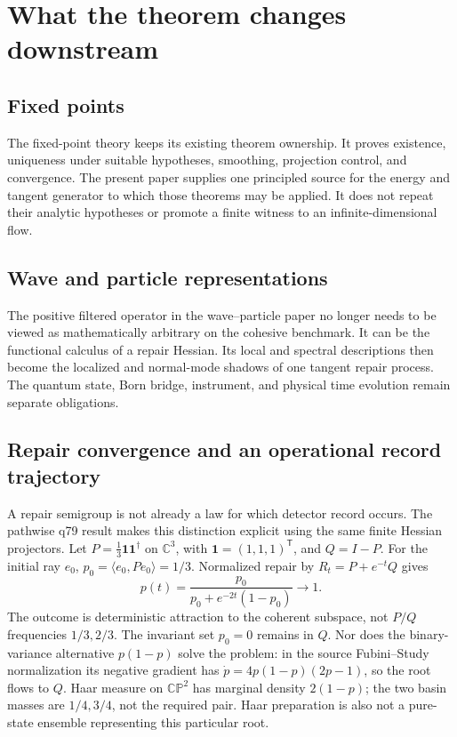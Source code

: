 \documentclass[11pt,a4paper]{article}
\begin{document}
\section{What the theorem changes downstream}

\subsection{Fixed points}

The fixed-point theory keeps its existing theorem ownership.  It proves
existence, uniqueness under suitable hypotheses, smoothing, projection
control, and convergence.  The present paper supplies one principled source
for the energy and tangent generator to which those theorems may be applied.
It does not repeat their analytic hypotheses or promote a finite witness to
an infinite-dimensional flow.

\subsection{Wave and particle representations}

The positive filtered operator in the wave--particle paper no longer needs
to be viewed as mathematically arbitrary on the cohesive benchmark.  It can
be the functional calculus of a repair Hessian.  Its local and spectral
descriptions then become the localized and normal-mode shadows of one tangent
repair process.  The quantum state, Born bridge, instrument, and physical
time evolution remain separate obligations.

\subsection{Repair convergence and an operational record trajectory}
\label{sec:q79-pathwise-repair}

A repair semigroup is not already a law for which detector record occurs.
The pathwise q79 result \cite{Q79PathwiseRepair2026} makes this distinction
explicit using the same finite Hessian projectors. Let
\(P=\frac13\mathbf1\mathbf1^\dagger\) on \(\mathbb C^3\), with
\(\mathbf1=(1,1,1)^{\mathsf T}\), and \(Q=I-P\).
For the initial ray \(e_0\), \(p_0=\langle e_0,Pe_0\rangle=1/3\).
Normalized repair by \(R_t=P+e^{-t}Q\) gives
\begin{equation}
 p(t)=\frac{p_0}{p_0+e^{-2t}(1-p_0)}\longrightarrow1 .
 \tag{Q5}\label{eq:q79-repair-weight}
\end{equation}
The outcome is deterministic attraction to the coherent subspace, not
\(P/Q\) frequencies \(1/3,2/3\). The invariant set \(p_0=0\) remains in
\(Q\). Nor does the binary-variance alternative \(p(1-p)\) solve the problem:
in the source Fubini--Study normalization its negative gradient has
\(\dot p=4p(1-p)(2p-1)\), so the root flows to \(Q\). Haar measure on
\(\mathbb{CP}^2\) has marginal density \(2(1-p)\); the two basin masses
are \(1/4,3/4\), not the required pair. Haar preparation is also not a
pure-state ensemble representing this particular root.
\end{document}
